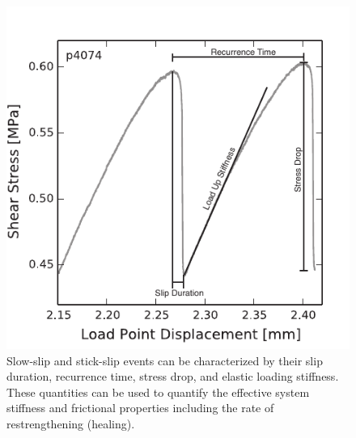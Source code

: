 \clearpage

\begin{figure}[t!]
\begin{centering}
\includegraphics{chap_granular_stiffness/Fig4.pdf}
\caption{\label{fig:stickslip}
Slow-slip and stick-slip events can be characterized by their slip duration, recurrence time, stress drop, and elastic loading stiffness.  These quantities can be used to quantify the effective system stiffness and frictional properties including the rate of restrengthening (healing).    }
\end{centering}
\end{figure}



